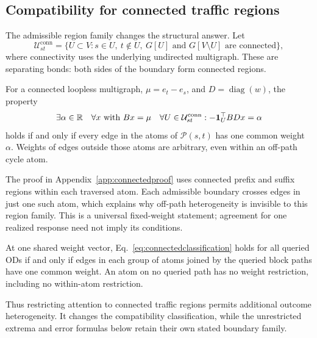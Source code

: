 \subsection{Compatibility for connected traffic regions}\label{sec:connectedclassification}
The admissible region family changes the structural answer. Let
\[
\mathcal U^{\mathrm{conn}}_{st}=\{U\subset V:s\in U,\ t\notin U,
\ G[U]\text{ and }G[V\setminus U]\text{ are connected}\},
\]
where connectivity uses the underlying undirected multigraph. These are
separating bonds: both sides of the boundary form connected regions.
\begin{theorem}\label{thm:connectedclassification}
For a connected loopless multigraph, $\mu=e_t-e_s$, and
$D=\operatorname{diag}(w)$, the property
\begin{equation}
\exists\alpha\in\mathbb{R}\quad\forall x\text{ with }Bx=\mu\quad
\forall U\in\mathcal U^{\mathrm{conn}}_{st}:
-\mathbf1_U^\top BDx=\alpha
\label{eq:connectedclassification}
\end{equation}
holds if and only if every edge in the atoms of $\mathcal P(s,t)$ has
one common weight $\alpha$. Weights of edges outside those atoms are
arbitrary, even within an off-path cycle atom.
\end{theorem}
The proof in Appendix~\ref{app:connectedproof} uses connected prefix and
suffix regions within each traversed atom. Each admissible boundary
crosses edges in just one such atom, which explains why off-path
heterogeneity is invisible to this region family. This is a universal
fixed-weight statement; agreement for one realized response need not
imply its conditions.

\begin{corollary}\label{cor:connectedmulti}
At one shared weight vector, Eq.~\eqref{eq:connectedclassification} holds
for all queried ODs if and only if edges in each group of atoms joined
by the queried block paths have one common weight. An atom on no queried
path has no weight restriction, including no within-atom restriction.
\end{corollary}
Thus restricting attention to connected traffic regions permits additional
outcome heterogeneity. It changes the compatibility classification,
while the unrestricted extrema and error formulas below retain their
own stated boundary family.
